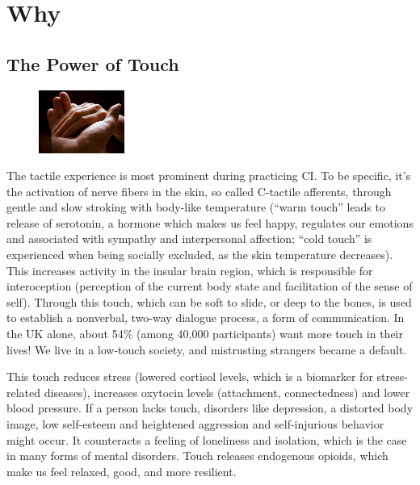 \section{Why}\label{sec:why}

\subsection{The Power of Touch}\label{subsec:the-power-of-touch}

\begin{figure}
\centering
\includegraphics[width=0.25\textwidth]{images/why}
\end{figure}

The tactile experience is most prominent during practicing CI. To be specific, it's the activation of nerve fibers in the skin, so called C-tactile afferents, through gentle and slow stroking with body-like temperature (``warm touch'' leads to release of serotonin, a hormone which makes us feel happy, regulates our emotions and associated with sympathy and interpersonal affection; ``cold touch'' is experienced when being socially excluded, as the skin temperature decreases).
This increases activity in the insular brain region, which is responsible for interoception (perception of the current body state and facilitation of the sense of self).
Through this touch, which can be soft to slide, or deep to the bones, is used to establish a nonverbal, two-way dialogue process, a form of communication.
In the UK alone, about 54\% (among 40,000 participants) want more touch in their lives!
We live in a low-touch society, and mistrusting strangers became a default.

This touch reduces stress (lowered cortisol levels, which is a biomarker for stress-related diseases), increases oxytocin levels (attachment, connectedness) and lower blood pressure.
If a person lacks touch, disorders like depression, a distorted body image, low self-esteem and heightened aggression and self-injurious behavior might occur.
It counteracts a feeling of loneliness and isolation, which is the case in many forms of mental disorders.
Touch releases endogenous opioids, which make us feel relaxed, good, and more resilient.

